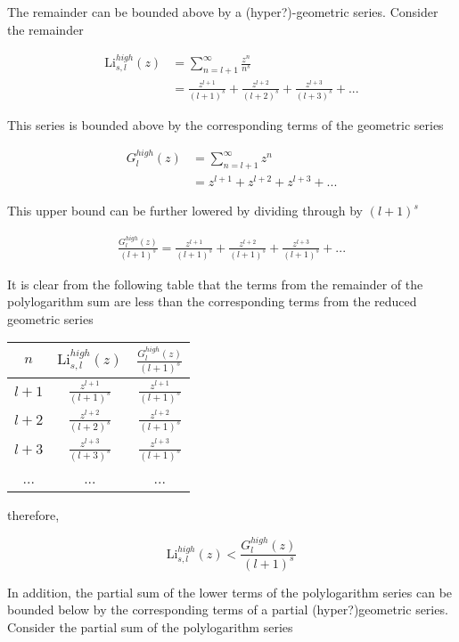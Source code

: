 \documentclass[letterpaper,12pt]{article}
\newcommand{\Li}{\textrm{Li}}
\begin{document}
The remainder can be bounded above by a (hyper?)-geometric series. Consider the remainder 

\begin{align} \label{eq:38}
\Li_{s,l}^{high}(z) &= \sum_{n = l + 1}^{\infty} \frac{z^{n}}{n^{s}} \\
 &= \frac{z^{l+1}}{(l+1)^{s}} + \frac{z^{l+2}}{(l+2)^{s}} + \frac{z^{l+3}}{(l+3)^{s}} + ...
\end{align}

\noindent This series is bounded above by the corresponding terms of the geometric series

\begin{align} \label{eq:39}
G_{l}^{high}(z) &= \sum_{n = l + 1}^{\infty} z^{n} \\
 &= z^{l+1} + z^{l+2} + z^{l+3} + ...
\end{align}

\noindent This upper bound can be further lowered by dividing through by $(l + 1)^{s}$

\begin{align} \label{eq:40}
\frac{G_{l}^{high}(z)}{(l+1)^{s}} = 
\frac{z^{l+1}}{(l+1)^{s}} + \frac{z^{l+2}}{(l+1)^{s}} + \frac{z^{l+3}}{(l+1)^{s}} + ...
\end{align}

It is clear from the following table that the terms from the remainder of the polylogarithm sum are less than the corresponding terms from the reduced geometric series 

\begin{tabular}{ccc}
$n$ & $\Li_{s,l}^{high}(z)$ & $\frac{G_{l}^{high}(z)}{(l+1)^{s}}$ \\
\hline
$l+1$ & $\frac{z^{l+1}}{(l+1)^{s}}$ & $\frac{z^{l+1}}{(l+1)^{s}}$ \\
$l+2$ & $\frac{z^{l+2}}{(l+2)^{s}}$ & $\frac{z^{l+2}}{(l+1)^{s}}$ \\
$l+3$ & $\frac{z^{l+3}}{(l+3)^{s}}$ & $\frac{z^{l+3}}{(l+1)^{s}}$ \\
... & ... & ... \\
\end{tabular}

\noindent therefore,

\begin{equation} \label{eq:41}
\Li_{s,l}^{high}(z) < \frac{G_{l}^{high}(z)}{(l+1)^{s}}
\end{equation}

In addition, the partial sum of the lower terms of the polylogarithm series can be bounded below by the corresponding terms of a partial (hyper?)geometric series. Consider the partial sum of the polylogarithm series
\end{document}
